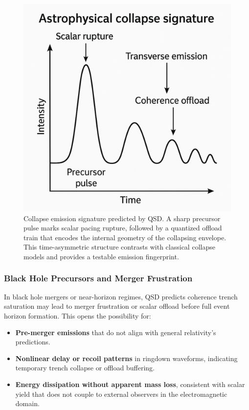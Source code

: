 \documentclass[entropy,article,submit,pdftex,moreauthors]{Definitions/mdpi}
\begin{document}
\begin{figure}[H]
  \centering
  \includegraphics[width=0.85\linewidth]{figures/astrocollapse.pdf}
  \caption{Collapse emission signature predicted by QSD. A sharp precursor pulse marks scalar pacing rupture, followed by a quantized offload train that encodes the internal geometry of the collapsing envelope. This time-asymmetric structure contrasts with classical collapse models and provides a testable emission fingerprint.}
  \label{fig:collapse_signature}
\end{figure}

\subsubsection{Black Hole Precursors and Merger Frustration}

In black hole mergers or near-horizon regimes, QSD predicts coherence trench saturation may lead to merger frustration or scalar offload before full event horizon formation. This opens the possibility for:
\begin{itemize}
  \item \textbf{Pre-merger emissions} that do not align with general relativity’s predictions.
  \item \textbf{Nonlinear delay or recoil patterns} in ringdown waveforms, indicating temporary trench collapse or offload buffering.
  \item \textbf{Energy dissipation without apparent mass loss}, consistent with scalar yield that does not couple to external observers in the electromagnetic domain.
\end{itemize}
\end{document}
